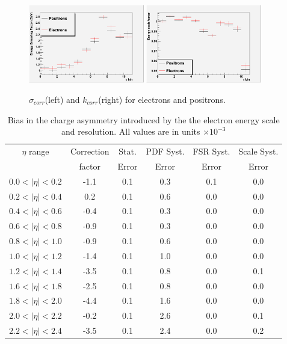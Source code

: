 \begin{figure}[htb]
  \begin{center}
\includegraphics*[width=0.45\textwidth]{ENSmeChargeSep.png}
\includegraphics*[width=0.45\textwidth]{ENKfactChargeSep.png}
 \caption{\label{Scale_sep} $\sigma_{corr}$(left) and $k_{corr}$(right) for electrons and positrons.}
\end{center}
\end{figure}

\begin{table}[htb]
  \begin{center}
    \begin{tabular}{cccccc}
$\eta$ range & Correction  & Stat.   &PDF  Syst. &  FSR Syst. & Scale Syst.\\
          & factor & Error & Error   & Error  & Error  \\
     \hline
 $0.0<|\eta|<0.2$ & -1.1 & 0.1 & 0.3  &0.1 & 0.0\\
 $0.2<|\eta|<0.4$ &  0.2 & 0.1 & 0.6  &0.0 & 0.0\\
 $0.4<|\eta|<0.6$ & -0.4 & 0.1 & 0.3  &0.0 & 0.0\\
 $0.6<|\eta|<0.8$ & -0.9 & 0.1 & 0.3  &0.0 & 0.0\\
 $0.8<|\eta|<1.0$ & -0.9 & 0.1 & 0.6  &0.0 & 0.0\\
 $1.0<|\eta|<1.2$ & -1.4 & 0.1 & 1.0  &0.0 & 0.0\\
 $1.2<|\eta|<1.4$ & -3.5 & 0.1 & 0.8  &0.0 & 0.1\\
 $1.6<|\eta|<1.8$ & -2.5 & 0.1 & 0.8  &0.0 & 0.0\\
 $1.8<|\eta|<2.0$ & -4.4 & 0.1 & 1.6  &0.0 & 0.0\\
 $2.0<|\eta|<2.2$ & -0.2 & 0.1 & 2.6  &0.0 & 0.1\\
 $2.2<|\eta|<2.4$ & -3.5 & 0.1 & 2.4  &0.0 & 0.2\\
    \end{tabular}
    \caption{\label{tab:acc}Bias in the charge asymmetry introduced by the the electron energy scale and resolution.
 All values are in units $\times 10^{-3}$}
  \end{center}
\end{table}

